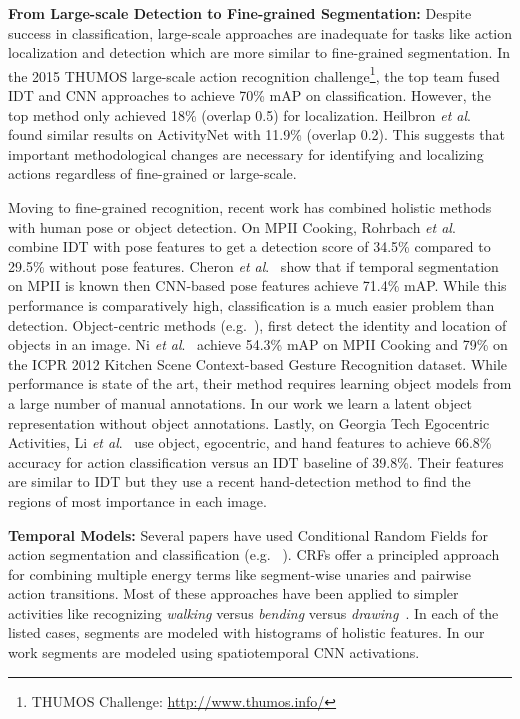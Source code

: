 \documentclass[runningheads]{llncs}
\newcommand{\fakesubsection}[1]{\smallskip\noindent\textbf{#1:}}
\newcommand{\etal}{\emph{et al}.}
\begin{document}
\fakesubsection{From Large-scale Detection to Fine-grained Segmentation}
Despite success in classification, large-scale approaches are inadequate for tasks like action localization and detection which are more similar to fine-grained segmentation. In the 2015 THUMOS large-scale action recognition challenge\footnote{THUMOS Challenge: \url{http://www.thumos.info/}}, the top team fused IDT and CNN approaches to achieve 70\% mAP on classification. However, the top method only achieved 18\% (overlap  0.5) for localization. 
Heilbron \etal~\cite{heilbron_cvpr_2015} found similar results on ActivityNet with 11.9\% (overlap  0.2). 
This suggests that important methodological changes are necessary for identifying and localizing actions regardless of fine-grained or large-scale.  


Moving to fine-grained recognition, recent work has combined holistic methods with human pose or object detection.
On MPII Cooking, Rohrbach \etal~\cite{rohrbach_ijcv_2015} combine IDT with pose features to get a detection score of 34.5\% compared to 29.5\% without pose features.
Cheron \etal~\cite{cheron_iccv_2015} show that if temporal segmentation on MPII is known then CNN-based pose features achieve 71.4\% mAP. While this performance is comparatively high, classification is a much easier problem than detection. 
Object-centric methods (e.g.~\cite{fathi_cvpr_2013,li_cvpr_2015,ni_cvpr_2014}), first detect the identity and location of objects in an image. 
Ni \etal~\cite{ni_cvpr_2014} achieve 54.3\% mAP on MPII Cooking and 79\% on the ICPR 2012 Kitchen Scene Context-based Gesture Recognition dataset.
While performance is state of the art, their method requires learning object models from a large number of manual annotations. 
In our work we learn a latent object representation without object annotations.
Lastly, on Georgia Tech Egocentric Activities, Li \etal~\cite{li_cvpr_2015}
use object, egocentric, and hand features to achieve 66.8\% accuracy for action classification versus an IDT baseline of 39.8\%. 
Their features are similar to IDT but they use a recent hand-detection method to find the regions of most importance in each image. 





\fakesubsection{Temporal Models}
Several papers have used Conditional Random Fields for action segmentation and classification (e.g. ~\cite{tao_miccai_2013,pirsiavash_cvpr_2014,shi_ijcv_2011,tang_cvpr_2012}). 
CRFs offer a principled approach for combining multiple energy terms like segment-wise unaries and pairwise action transitions. 
Most of these approaches have been applied to simpler activities like recognizing \textit{walking} versus \textit{bending} versus \textit{drawing}~\cite{shi_ijcv_2011}.
In each of the listed cases, segments are modeled with histograms of holistic features. In our work segments are modeled using spatiotemporal CNN activations.
\end{document}

